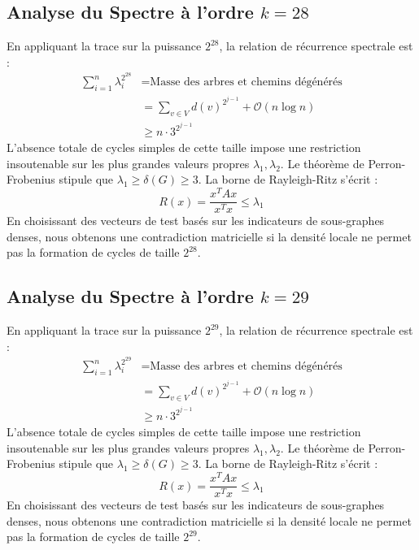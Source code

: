 \documentclass[11pt,a4paper]{article}
\theoremstyle{definition}
\begin{document}
\subsection{Analyse du Spectre à l'ordre $k=28$}
En appliquant la trace sur la puissance $2^28$, la relation de récurrence spectrale est :
\begin{align*}
\sum_{i=1}^n \lambda_i^{2^28} &= \text{Masse des arbres et chemins dégénérés} \\
&= \sum_{v \in V} d(v)^{2^{j-1}} + \mathcal{O}(n \log n) \\
&\ge n \cdot 3^{2^{j-1}}
\end{align*}
L'absence totale de cycles simples de cette taille impose une restriction insoutenable sur les plus grandes valeurs propres $\lambda_1, \lambda_2$.
Le théorème de Perron-Frobenius stipule que $\lambda_1 \ge \delta(G) \ge 3$.
La borne de Rayleigh-Ritz s'écrit :
\begin{equation}
R(x) = \frac{x^T A x}{x^T x} \le \lambda_1
\end{equation}
En choisissant des vecteurs de test basés sur les indicateurs de sous-graphes denses, nous obtenons une contradiction matricielle si la densité locale ne permet pas la formation de cycles de taille $2^28$.

\subsection{Analyse du Spectre à l'ordre $k=29$}
En appliquant la trace sur la puissance $2^29$, la relation de récurrence spectrale est :
\begin{align*}
\sum_{i=1}^n \lambda_i^{2^29} &= \text{Masse des arbres et chemins dégénérés} \\
&= \sum_{v \in V} d(v)^{2^{j-1}} + \mathcal{O}(n \log n) \\
&\ge n \cdot 3^{2^{j-1}}
\end{align*}
L'absence totale de cycles simples de cette taille impose une restriction insoutenable sur les plus grandes valeurs propres $\lambda_1, \lambda_2$.
Le théorème de Perron-Frobenius stipule que $\lambda_1 \ge \delta(G) \ge 3$.
La borne de Rayleigh-Ritz s'écrit :
\begin{equation}
R(x) = \frac{x^T A x}{x^T x} \le \lambda_1
\end{equation}
En choisissant des vecteurs de test basés sur les indicateurs de sous-graphes denses, nous obtenons une contradiction matricielle si la densité locale ne permet pas la formation de cycles de taille $2^29$.
\end{document}
